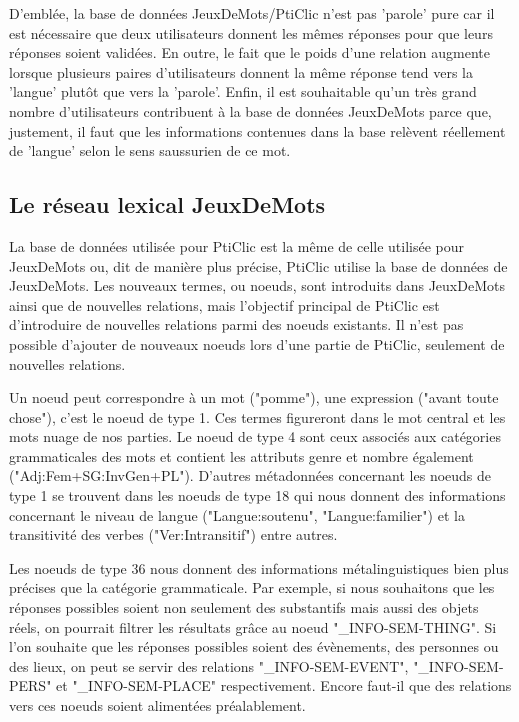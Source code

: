 \documentclass[a4paper,11pt,french]{article}
\begin{document}
D'emblée, la base de données JeuxDeMots/PtiClic n'est pas 'parole' pure car il est nécessaire que deux utilisateurs donnent les mêmes réponses pour que leurs réponses soient validées. En outre, le fait que le poids d'une relation augmente lorsque plusieurs paires d'utilisateurs donnent la même réponse tend vers la 'langue' plutôt que vers la 'parole'. Enfin, il est souhaitable qu'un très grand nombre d'utilisateurs contribuent à la base de données JeuxDeMots parce que, justement, il faut que les informations contenues dans la base relèvent réellement de 'langue' selon le sens saussurien de ce mot. 


\subsection{Le réseau lexical JeuxDeMots}

La base de données utilisée pour PtiClic est la même de celle utilisée pour JeuxDeMots ou, dit de manière plus précise, PtiClic utilise la base de données de JeuxDeMots. Les nouveaux termes, ou noeuds, sont introduits dans JeuxDeMots ainsi que de nouvelles relations, mais l'objectif principal de PtiClic est d'introduire de nouvelles relations parmi des noeuds existants. Il n'est pas possible d'ajouter de nouveaux noeuds lors d'une partie de PtiClic, seulement de nouvelles relations. 

Un noeud peut correspondre à un mot ("pomme"), une expression ("avant toute chose"), c'est le noeud de type 1. Ces termes figureront dans le mot central et les mots nuage de nos parties. Le noeud de type 4 sont ceux associés aux catégories grammaticales des mots et contient les attributs genre et nombre également ("Adj:Fem+SG:InvGen+PL"). D'autres métadonnées concernant les noeuds de type 1 se trouvent dans les noeuds de type 18 qui nous donnent des informations concernant le niveau de langue ("Langue:soutenu", "Langue:familier") et la transitivité des verbes ("Ver:Intransitif") entre autres.

Les noeuds de type 36 nous donnent des informations métalinguistiques bien plus précises que la catégorie grammaticale. Par exemple, si nous souhaitons que les réponses possibles soient non seulement des substantifs mais aussi des objets réels, on pourrait filtrer les résultats grâce au noeud "\_INFO-SEM-THING". Si l'on souhaite que les réponses possibles soient des évènements, des personnes ou des lieux, on peut se servir des relations "\_INFO-SEM-EVENT", "\_INFO-SEM-PERS" et "\_INFO-SEM-PLACE" respectivement. Encore faut-il que des relations vers ces noeuds soient alimentées préalablement. 
\end{document}
